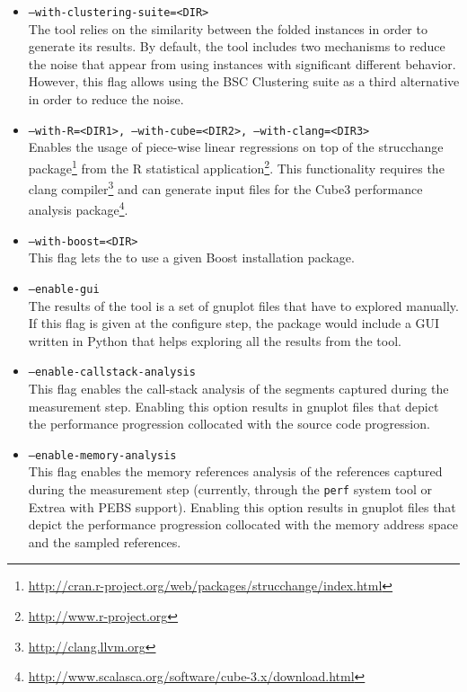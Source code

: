 \begin{itemize}

	\item \texttt{--with-clustering-suite=<DIR>}\\
    The \FOLDING tool relies on the similarity between the folded instances in order to generate its results. By default, the \FOLDING tool includes two mechanisms to reduce the noise that appear from using instances with significant different behavior. However, this flag allows using the BSC Clustering suite as a third alternative in order to reduce the noise.

	\item \texttt{--with-R=<DIR1>, --with-cube=<DIR2>, --with-clang=<DIR3>}\\
	Enables the usage of piece-wise linear regressions on top of the strucchange package\footnote{\url{http://cran.r-project.org/web/packages/strucchange/index.html}} from the R statistical application\footnote{\url{http://www.r-project.org}}. This functionality requires the clang compiler\footnote{\url{http://clang.llvm.org}} and can generate input files for the Cube3 performance analysis package\footnote{\url{http://www.scalasca.org/software/cube-3.x/download.html}}.

	\item \texttt{--with-boost=<DIR>}\\
	This flag lets the \FOLDING to use a given Boost installation package.

	\item \texttt{--enable-gui}\\
	The results of the \FOLDING tool is a set of gnuplot files that have to explored manually. If this flag is given at the configure step, the \FOLDING package would include a GUI written in Python that helps exploring all the results from the tool.

	\item \texttt{--enable-callstack-analysis}\\
	This flag enables the call-stack analysis of the segments captured during the measurement step. Enabling this option results in gnuplot files that depict the performance progression collocated with the source code progression.

	\item \texttt{--enable-memory-analysis}\\
	This flag enables the memory references analysis of the references captured during the measurement step (currently, through the \texttt{perf} system tool or Extrea with PEBS support). Enabling this option results in gnuplot files that depict the performance progression collocated with the memory address space and the sampled references.

\end{itemize}

